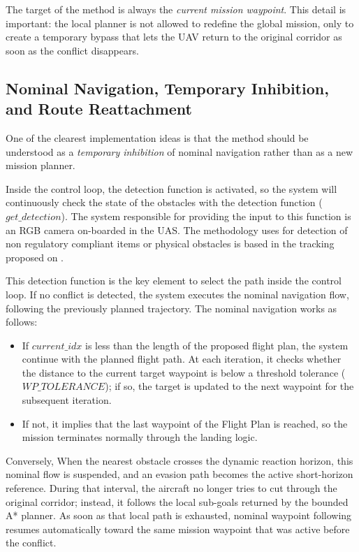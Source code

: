 \documentclass[journal,twoside,web]{ieeecolor}
\begin{document}
The target of the method is always the \emph{current mission waypoint}. This detail is important: the local planner is not allowed to redefine the global mission, only to create a temporary bypass that lets the UAV return to the original corridor as soon as the conflict disappears.

\subsection{Nominal Navigation, Temporary Inhibition, and Route Reattachment}

One of the clearest implementation ideas is that the method should be understood as a \emph{temporary inhibition} of nominal navigation rather than as a new mission planner. 

Inside the control loop, the detection function is activated, so the system will continuously check the state of the obstacles with the detection function ($get\_detection$). The system responsible for providing the input to this function is an RGB camera on-boarded in the UAS. The methodology uses for detection of non regulatory compliant items or physical obstacles is based in the tracking proposed on \cite{alaez2023real}.

This detection function is the key element to select the path inside the control loop. If no conflict is detected, the system executes the nominal navigation flow, following the previously planned trajectory. The nominal navigation works as follows: 
\begin{itemize}
    \item If $current\_idx$ is less than the length of the proposed flight plan, the system continue with the planned flight path. At each iteration, it checks whether the distance to the current target waypoint is below a threshold tolerance ($WP\_TOLERANCE$); if so, the target is updated to the next waypoint for the subsequent iteration. 
    \item If not, it implies that the last waypoint of the Flight Plan is reached, so the mission terminates normally through the landing logic.
\end{itemize}

Conversely, When the nearest obstacle crosses the dynamic reaction horizon, this nominal flow is suspended, and an evasion path becomes the active short-horizon reference. During that interval, the aircraft no longer tries to cut through the original corridor; instead, it follows the local sub-goals returned by the bounded A* planner. As soon as that local path is exhausted, nominal waypoint following resumes automatically toward the same mission waypoint that was active before the conflict.
\end{document}
